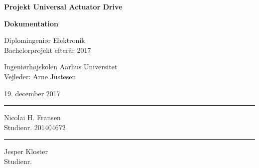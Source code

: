 \documentclass[11pt, a4paper, twoside, openany]{memoir}
\date{}
\author{\forfatter}
\title{\titel}
\begin{document}
\begin{titlingpage}
		
		\begin{center}
				{\huge\bfseries Projekt Universal Actuator Drive}\\
				\vspace{10pt}
				
				{\Huge\bfseries Dokumentation}\\
				
				\vspace{20pt}
				
				{Diplomingeniør Elektronik}\\
				{\large Bachelorprojekt efterår 2017}\\
				
				\vspace{10pt}
				
				Ingeniørhøjskolen Aarhus Universitet\\
				Vejleder: Arne Justesen
				\vspace{10pt}
				
				19. december 2017
				\vspace{10pt}

				\vspace{50pt}
				\begin{minipage}{0.25\linewidth}
					\centering
					\hrule
					\vspace{12pt}
					Nicolai H. Fransen\\
					Studienr. 201404672
				\end{minipage}
				\hspace{10pt}
				\begin{minipage}{0.25\linewidth}
					\centering
					\hrule
					\vspace{12pt}
					Jesper Kloster\\
					Studienr. 
				\end{minipage}
				\hspace{10pt}
		\end{center}
		
		\clearpage
		
	\setcounter{tocdepth}{2}
	\tableofcontents
	\clearpage
	
	
	
	
	
	
	

	

	
	
	\printbibliography[title={Litteraturliste}]
	
\end{titlingpage}
\end{document}
